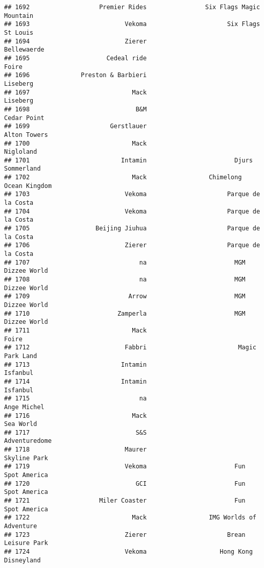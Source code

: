 \documentclass[
]{article}
\begin{document}
\begin{verbatim}
## 1692                   Premier Rides                Six Flags Magic Mountain
## 1693                          Vekoma                      Six Flags St Louis
## 1694                          Zierer                             Bellewaerde
## 1695                     Cedeal ride                                   Foire
## 1696              Preston & Barbieri                                Liseberg
## 1697                            Mack                                Liseberg
## 1698                             B&M                             Cedar Point
## 1699                      Gerstlauer                            Alton Towers
## 1700                            Mack                               Nigloland
## 1701                         Intamin                        Djurs Sommerland
## 1702                            Mack                 Chimelong Ocean Kingdom
## 1703                          Vekoma                      Parque de la Costa
## 1704                          Vekoma                      Parque de la Costa
## 1705                  Beijing Jiuhua                      Parque de la Costa
## 1706                          Zierer                      Parque de la Costa
## 1707                              na                        MGM Dizzee World
## 1708                              na                        MGM Dizzee World
## 1709                           Arrow                        MGM Dizzee World
## 1710                        Zamperla                        MGM Dizzee World
## 1711                            Mack                                   Foire
## 1712                          Fabbri                         Magic Park Land
## 1713                         Intamin                                Isfanbul
## 1714                         Intamin                                Isfanbul
## 1715                              na                             Ange Michel
## 1716                            Mack                               Sea World
## 1717                             S&S                           Adventuredome
## 1718                          Maurer                            Skyline Park
## 1719                          Vekoma                        Fun Spot America
## 1720                             GCI                        Fun Spot America
## 1721                   Miler Coaster                        Fun Spot America
## 1722                            Mack                 IMG Worlds of Adventure
## 1723                          Zierer                      Brean Leisure Park
## 1724                          Vekoma                    Hong Kong Disneyland

\end{verbatim}
\end{document}

